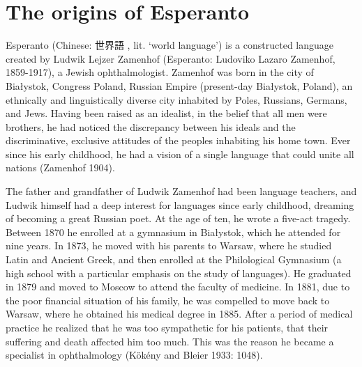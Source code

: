 \section{The origins of Esperanto}

Esperanto (Chinese: 世界語 , lit. `world language') is a constructed language created by Ludwik Lejzer Zamenhof (Esperanto: Ludoviko Lazaro Zamenhof, 1859-1917), a Jewish ophthalmologist.
Zamenhof was born in the city of Białystok, Congress Poland, Russian Empire (present-day Białystok, Poland), an ethnically and linguistically diverse city inhabited by Poles, Russians, Germans, and Jews.
Having been raised as an idealist, in the belief that all men were brothers, he had noticed the discrepancy between his ideals and the discriminative, exclusive attitudes of the peoples inhabiting his home town.
Ever since his early childhood, he had a vision of a single language that could unite all nations (Zamenhof 1904).

The father and grandfather of Ludwik Zamenhof had been language teachers, and Ludwik himself had a deep interest for languages since early childhood, dreaming of becoming a great Russian poet.
At the age of ten, he wrote a five-act tragedy.
Between 1870 he enrolled at a gymnasium in Białystok, which he attended for nine years.
In 1873, he moved with his parents to Warsaw, where he studied Latin and Ancient Greek, and then enrolled at the Philological Gymnasium (a high school with a particular emphasis on the study of languages).
He graduated in 1879 and moved to Moscow to attend the faculty of medicine.
In 1881, due to the poor financial situation of his family, he was compelled to move back to Warsaw, where he obtained his medical degree in 1885.
After a period of medical practice he realized that he was too sympathetic for his patients, that their suffering and death affected him too much.
This was the reason he became a specialist in ophthalmology
(Kökény and Bleier 1933: 1048).

